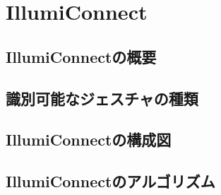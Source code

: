 \chapter{IllumiConnect}
\section{IllumiConnectの概要}
\section{識別可能なジェスチャの種類}
\section{IllumiConnectの構成図}
\section{IllumiConnectのアルゴリズム}
